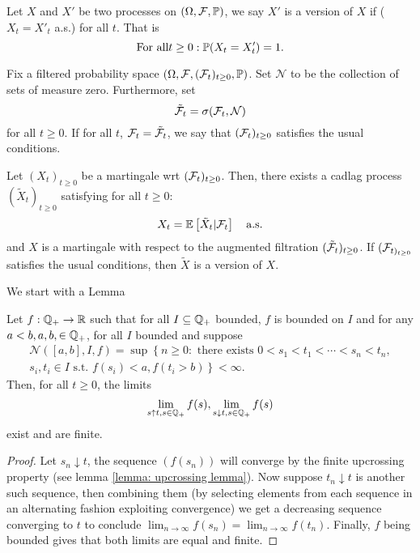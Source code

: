 \documentclass{article}
\begin{document}
\begin{boxdef}\label{def: version processes}
Let $ X$ and $ X'$ be two processes on $ (\Omega, \mathcal{F}, \mathbb{P})$, we say $ X'$ is a version of $ X$ if ($X_{t} = X'_{t}$ a.s.) for all $ t$. That is 
\[
\text{For all} t\geq 0: \mathbb{P}(X_{t} = X'_{t})=1.
\]
\end{boxdef}


\begin{boxdef}\label{def: sigma null sets}
Fix a filtered probability space $ (\Omega, \mathcal{F}, (\mathcal{F}_{t})_{t\geq 0}, \mathbb{P})$. Set $ \mathcal{N}$ to be the collection of sets of measure zero. Furthermore, set 
\[
	\tilde{\mathcal{F}}_{t} = \sigma(\mathcal{F}_{t}, \mathcal{N})
\]
for all $ t\geq 0$. If for all $ t$, $ \mathcal{F}_{t} = \tilde{\mathcal{F}}_{t}$, we say that $ (\mathcal{F}_{t})_{t\geq 0}$ satisfies the usual conditions. 
\end{boxdef}


\begin{theorem}\label{thm: mg reg thm}
	Let $ (X_{t})_{t\geq 0 }$ be a martingale wrt $ (\mathcal{F}_{t})_{t\geq 0}$. Then, there exists a cadlag process $ (\tilde{X}_{t})_{t\geq 0}$ satisfying for all $ t\geq 0$:
	\[
		X_{t} = \mathbb{E}\left[ \tilde{X}_{t}| \mathcal{F}_{t} \right] \quad \text{a.s.}
	\]
	and $ X$ is a martingale with respect to the augmented filtration $ (\tilde{\mathcal{F}}_{t})_{t\geq 0}$. If $ (\mathcal{F}_{t)_{t\geq 0}}$ satisfies the usual conditions, then $ \tilde{X}$ is a version of $ X$. 
\end{theorem}

We start with a Lemma
\begin{boxlemma}\label{lemma: mg reg lemma}
Let $ f: \mathbb{Q}_{+}\to \mathbb{R}$ such that for all $ I\subseteq \mathbb{Q}_{+}$ bounded, $ f$ is bounded on $ I$ and for any $ a<b, a,b,\in \mathbb{Q}_{+}$, for all $ I$ bounded and suppose 
\[
\begin{array}{ll}
	\mathcal{N}([a,b], I, f) = \displaystyle\sup\left\{ n\geq 0 : \text{ there exists } 0<s_{1}<t_{1}<\cdots <s_{n}<t_{n},\right. \\ 
	\left.s_{i}, t_{i}\in I \text{ s.t. } f(s_{i})<a, f(t_{i}>b)\right\}<\infty.
\end{array}
\]
Then, for all $ t\geq 0$, the limits 
\[
\lim_{s\uparrow t, s\in \mathbb{Q}_{+}}f(s), \lim_{s\downarrow t, s\in \mathbb{Q}_{+}}f(s)  
\]
exist and are finite.
\end{boxlemma}

\begin{proof}
	Let $ s_{n}\downarrow t$, the sequence $ (f(s_{n}))$ will converge by the finite upcrossing property (see lemma \ref{lemma: upcrossing lemma}). Now suppose $ t_{n}\downarrow t$ is another such sequence, then combining them (by selecting elements from each sequence in an alternating fashion exploiting convergence) we get a decreasing sequence converging to $ t$ to conclude $ \lim_{n \to \infty} f(s_{n}) = \lim_{n \to \infty}f(t_{n})  $. Finally, $ f$ being bounded gives that both limits are equal and finite.
\end{proof}
\end{document}
